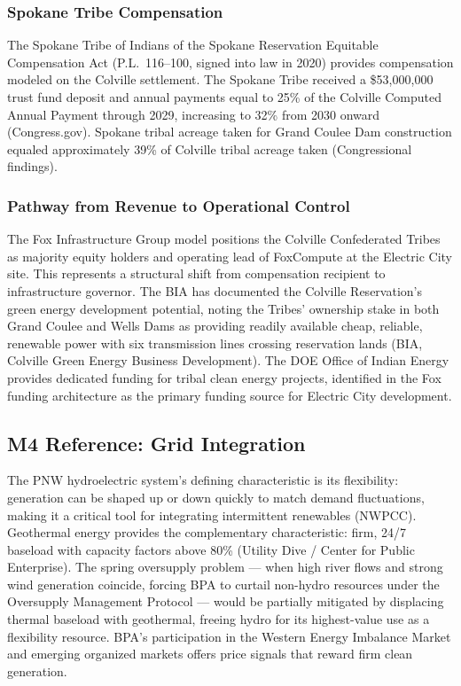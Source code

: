 \documentclass[11pt,letterpaper]{article}
\begin{document}
\subsubsection{Spokane Tribe Compensation}

The Spokane Tribe of Indians of the Spokane Reservation Equitable Compensation Act (P.L.\ 116--100, signed into law in 2020) provides compensation modeled on the Colville settlement. The Spokane Tribe received a \$53,000,000 trust fund deposit and annual payments equal to 25\% of the Colville Computed Annual Payment through 2029, increasing to 32\% from 2030 onward (Congress.gov). Spokane tribal acreage taken for Grand Coulee Dam construction equaled approximately 39\% of Colville tribal acreage taken (Congressional findings).

\subsubsection{Pathway from Revenue to Operational Control}

The Fox Infrastructure Group model positions the Colville Confederated Tribes as majority equity holders and operating lead of FoxCompute at the Electric City site. This represents a structural shift from compensation recipient to infrastructure governor. The BIA has documented the Colville Reservation's green energy development potential, noting the Tribes' ownership stake in both Grand Coulee and Wells Dams as providing readily available cheap, reliable, renewable power with six transmission lines crossing reservation lands (BIA, Colville Green Energy Business Development). The DOE Office of Indian Energy provides dedicated funding for tribal clean energy projects, identified in the Fox funding architecture as the primary funding source for Electric City development.

\subsection{M4 Reference: Grid Integration}

The PNW hydroelectric system's defining characteristic is its flexibility: generation can be shaped up or down quickly to match demand fluctuations, making it a critical tool for integrating intermittent renewables (NWPCC). Geothermal energy provides the complementary characteristic: firm, 24/7 baseload with capacity factors above 80\% (Utility Dive / Center for Public Enterprise). The spring oversupply problem --- when high river flows and strong wind generation coincide, forcing BPA to curtail non-hydro resources under the Oversupply Management Protocol --- would be partially mitigated by displacing thermal baseload with geothermal, freeing hydro for its highest-value use as a flexibility resource. BPA's participation in the Western Energy Imbalance Market and emerging organized markets offers price signals that reward firm clean generation.
\end{document}

